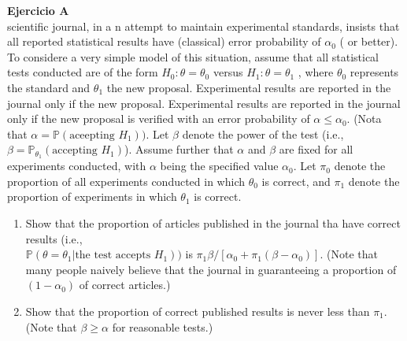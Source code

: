 \documentclass[a4paper, 11pt]{article}
\newenvironment{problem}[2][Ejercicio]
{ \begin{mdframed}[backgroundcolor= red!50] \textbf{#1 #2} \\}
	{  \end{mdframed}}
\begin{document}
\newpage

\begin{problem}{4} 
    A scientific journal, in a n attempt to maintain experimental standards, insists that all reported statistical results have (classical) error probability of $\alpha_0$ ( or better). To considere a very simple model of this situation, assume that all statistical tests conducted are of the form $ H_0: \theta = \theta_0$ versus $H_1: \theta = \theta_1$ , where $\theta_0$ represents the standard and $\theta_1$ the new proposal. Experimental results are reported in the journal only if the new proposal. Experimental results are reported in the journal only if the new proposal is verified with an error probability of $ \alpha \leq \alpha_0.$ (Nota that $\alpha = \mathbb{P}\left (\text{aceepting $H_1$} \right ))$. Let $\beta$ denote the power of the test (i.e., $\beta = \mathbb{P}_{\theta_1}\left ( \text{accepting } H_1 \right )$). Assume further that $\alpha$ and $\beta$ are fixed for all experiments conducted, with $\alpha$ being the specified value $\alpha_0$. Let $\pi_0$ denote the proportion of all experiments conducted in which $\theta_0$ is correct, and $\pi_1$ denote the proportion of experiments in which $ \theta_1$ is correct. 
    \begin{enumerate}
        \item Show that the proportion of articles published in the journal tha have correct results (i.e., \\
        $\mathbb{P}\left (\theta = \theta_1 | \text{the test accepts $H_1$}\right ))$ is $\pi_1 \beta /[\alpha_0+ \pi_1(\beta-\alpha_0)]$. (Note that many people naively believe that the journal in guaranteeing a proportion of $(1- \alpha_0)$ of correct articles.)
        \item Show that the proportion of correct published results is never less than $\pi_1$. (Note that $\beta \geq \alpha$ for reasonable tests.)
    \end{enumerate}
\end{problem}
\end{document}
